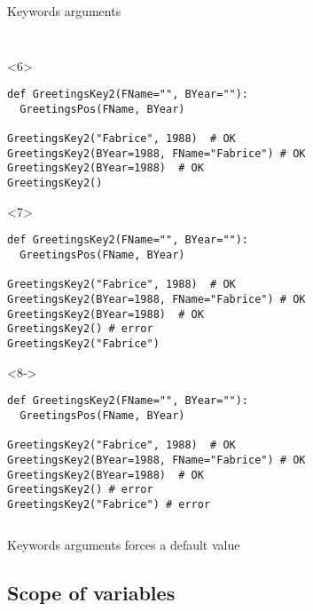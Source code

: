 \begin{frame}[fragile]{Keywords arguments}
\begin{columns}[onlytextwidth]
\begin{column}{\textwidth}
\begin{onlyenv}
\begin{lstlisting}[style=python]
 \end{lstlisting}
      \end{onlyenv}

      \begin{onlyenv}<6>
        \begin{lstlisting}[style=python]
def GreetingsKey2(FName="", BYear=""):
  GreetingsPos(FName, BYear)

GreetingsKey2("Fabrice", 1988)  # OK
GreetingsKey2(BYear=1988, FName="Fabrice") # OK
GreetingsKey2(BYear=1988)  # OK
GreetingsKey2()
 \end{lstlisting}
      \end{onlyenv}

      \begin{onlyenv}<7>
        \begin{lstlisting}[style=python]
def GreetingsKey2(FName="", BYear=""):
  GreetingsPos(FName, BYear)

GreetingsKey2("Fabrice", 1988)  # OK
GreetingsKey2(BYear=1988, FName="Fabrice") # OK
GreetingsKey2(BYear=1988)  # OK
GreetingsKey2() # error
GreetingsKey2("Fabrice") \end{lstlisting}
      \end{onlyenv}

      \begin{onlyenv}<8->
        \begin{lstlisting}[style=python]
def GreetingsKey2(FName="", BYear=""):
  GreetingsPos(FName, BYear)

GreetingsKey2("Fabrice", 1988)  # OK
GreetingsKey2(BYear=1988, FName="Fabrice") # OK
GreetingsKey2(BYear=1988)  # OK
GreetingsKey2() # error
GreetingsKey2("Fabrice") # error \end{lstlisting}
      \end{onlyenv}

    \end{column}
  \end{columns}

   Keywords arguments forces a default value

\end{frame}


\subsection{Scope of variables}

